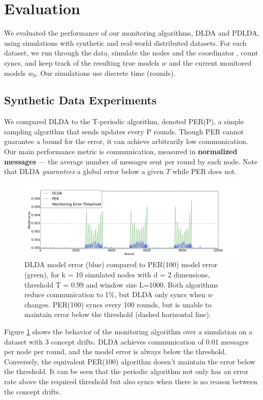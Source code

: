 \documentclass[11pt,twocolumn,varwidth=true,a4paper,fleqn]{article}
\begin{document}
\section{Evaluation}
We evaluated the performance of our monitoring algorithms,
DLDA and PDLDA, using simulations with synthetic and real-world 
distributed datasets. For each dataset, we run through 
the data, simulate the nodes and the coordinator , count syncs,
and keep track of the resulting true models $w$ and the
current monitored models $w_0$. Our simulations use discrete
time (rounds).
\subsection{Synthetic Data Experiments}
We compared DLDA to the T-periodic algorithm, denoted
PER(P), a simple sampling algorithm that sends updates
every P rounds. Though PER cannot guarantee a bound for the
error, it can achieve arbitrarily low communication.
Our main performance metric is communication, measured
in \textbf{normalized messages} --- the average number of messages sent per
round by each node. Note that DLDA \textit{guarantees}
a global error below a given $T$ while PER does not.

\begin{figure}[ht]
	\centering
	\includegraphics[width=\textwidth]{PER/PERvsDLDAoverTime.png}
	\caption{ DLDA model error (blue) compared to PER(100) model error (green), 
	for k = 10 simulated nodes with d = 2 dimensions, threshold T = 0.99 and
	window size L=1000. Both algorithms reduce communication to 1\%, but DLDA
	only syncs when $w$ changes. PER(100) syncs every 100 rounds, 
	but is unable to maintain error below the threshold (dashed horizontal line).}
	\label{PERvsDLDAoverTime}
\end{figure}
	
Figure \ref{PERvsDLDAoverTime} shows the behavior of the monitoring 
algorithm over a simulation on a dataset with 3 concept drifts. 
DLDA achieves communication of 0.01 messages per node per round, and 
the model error is always below the threshold. 
Conversely, the equivalent PER(100) algorithm doesn't maintain the
error below the threshold. It can be seen that the periodic algorithm 
not only has an error rate above the required threshold but also
syncs when there is no reason between the concept drifts.
\end{document}

